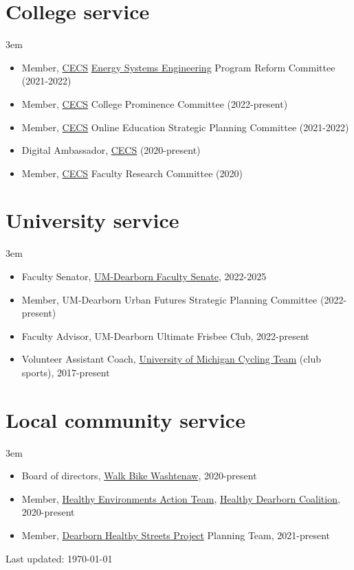 \documentclass[11pt]{article}
\newenvironment{main}
{\begin{adjustwidth}{3em}{}}
{\end{adjustwidth}}
\begin{document}
\section*{College service}
\begin{main}
\begin{itemize}
    \item Member, \href{https://umdearborn.edu/cecs}{CECS} \href{https://umdearborn.edu/cecs/departments/electrical-and-computer-engineering/graduate-programs/mse-energy-systems-engineering}{Energy Systems Engineering} Program Reform Committee (2021-2022)
    \item Member, \href{https://umdearborn.edu/cecs}{CECS} College Prominence Committee (2022-present)
    \item Member, \href{https://umdearborn.edu/cecs}{CECS} Online Education Strategic Planning Committee (2021-2022)
    \item Digital Ambassador, \href{https://umdearborn.edu/cecs}{CECS} (2020-present)
    \item Member, \href{https://umdearborn.edu/cecs}{CECS} Faculty Research Committee (2020)
\end{itemize}


\end{main}
\section*{University service}
\begin{main}
\begin{itemize}
    \item Faculty Senator, \href{https://umdearborn.edu/faculty-senate}{UM-Dearborn Faculty Senate}, 2022-2025
    \item Member, UM-Dearborn Urban Futures Strategic Planning Committee (2022-present)
    \item Faculty Advisor, UM-Dearborn Ultimate Frisbee Club, 2022-present
    \item Volunteer Assistant Coach, \href{https://www.umcycling.org/}{University of Michigan Cycling Team} (club sports), 2017-present
\end{itemize}


\end{main}
\section*{Local community service}
\begin{main}
\begin{itemize}
    \item Board of directors, \href{https://www.wbwc.org/}{Walk Bike Washtenaw}, 2020-present
    \item Member, \href{https://www.healthydearborn.org/healthy-environments}{Healthy Environments Action Team}, \href{https://www.healthydearborn.org/}{Healthy Dearborn Coalition}, 2020-present
    \item Member, \href{https://www.healthydearborn.org/dearbornhealthystreets}{Dearborn Healthy Streets Project} Planning Team, 2021-present
\end{itemize}

\vfill\hfill
Last updated: \today

\end{main}
\end{document}
